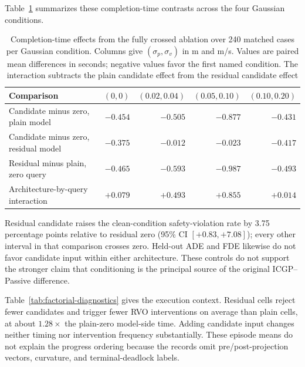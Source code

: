 \documentclass[pdflatex,sn-mathphys-num]{sn-jnl}
\begin{document}
Table~\ref{tab:factorial-time} summarizes these completion-time contrasts across the four Gaussian conditions.

\begin{table}[htbp]
\caption{Completion-time effects from the fully crossed ablation over 240 matched cases per Gaussian condition. Columns give $(\sigma_p,\sigma_v)$ in m and m/s. Values are paired mean differences in seconds; negative values favor the first named condition. The interaction subtracts the plain candidate effect from the residual candidate effect}
\label{tab:factorial-time}
\centering
\small
\begin{tabular}{@{}lrrrr@{}}
\toprule
Comparison & $(0,0)$ & $(0.02,0.04)$ & $(0.05,0.10)$ & $(0.10,0.20)$ \\
\midrule
Candidate minus zero, plain model & $-0.454$ & $-0.505$ & $-0.877$ & $-0.431$ \\
Candidate minus zero, residual model & $-0.375$ & $-0.012$ & $-0.023$ & $-0.417$ \\
Residual minus plain, zero query & $-0.465$ & $-0.593$ & $-0.987$ & $-0.493$ \\
Architecture-by-query interaction & $+0.079$ & $+0.493$ & $+0.855$ & $+0.014$ \\
\bottomrule
\end{tabular}
\end{table}

Residual candidate raises the clean-condition safety-violation rate by 3.75 percentage points relative to residual zero (95\% CI $[+0.83,+7.08]$); every other interval in that comparison crosses zero. Held-out ADE and FDE likewise do not favor candidate input within either architecture. These controls do not support the stronger claim that conditioning is the principal source of the original ICGP--Passive difference.

Table~\ref{tab:factorial-diagnostics} gives the execution context. Residual cells reject fewer candidates and trigger fewer RVO interventions on average than plain cells, at about $1.28\times$ the plain-zero model-side time. Adding candidate input changes neither timing nor intervention frequency substantially. These episode means do not explain the progress ordering because the records omit pre/post-projection vectors, curvature, and terminal-deadlock labels.
\end{document}
